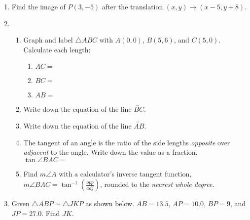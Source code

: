 \documentclass[12pt, twoside]{article}
\begin{document}
\begin{enumerate}
  \item Find the image of $P(3,-5)$ after the translation $(x,y) \rightarrow (x-5,y+8)$.
\newpage
  \item \begin{enumerate}[itemsep=1.4cm]
    \item Graph and label $\triangle ABC$ with $A(0,0)$, $B(5,6)$, and $C(5,0)$. Calculate each length:
    \begin{multicols}{2}
      \begin{enumerate}[itemsep=1.5cm]
        \item $AC=$
        \item $BC=$
        \item $AB=$ \vspace{3cm}
      \end{enumerate}
    \begin{center}
    \end{center}
  \end{multicols}%
    \item Write down the equation of the line $\overleftrightarrow{BC}$.
    \item Write down the equation of the line $\overleftrightarrow{AB}$. 
    \item The tangent of an angle is the ratio of the side lengths \emph{opposite} over \emph{adjacent} to the angle. Write down the value as a fraction. \\[0.5cm]
      $\tan \angle BAC=$
    \item Find $m\angle A$ with a calculator's inverse tangent function, $\displaystyle m \angle BAC = \tan^{-1}(\frac{opp}{adj})$, rounded to the \emph{nearest whole degree}.
    \vspace{2cm}
  \end{enumerate}

\newpage
  \item Given $\triangle ABP \sim \triangle JKP$ as shown below. $AB=13.5$, $AP=10.0$, $BP=9$, and $JP=27.0$. Find $JK$.
    \begin{flushright}
      \end{flushright}
      \vspace{0.5cm}
      

\end{enumerate}
\end{document}

